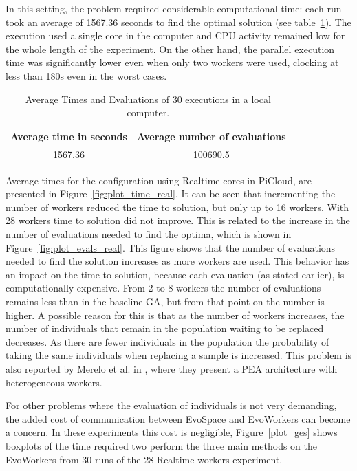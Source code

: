 In this setting, the problem required considerable computational time: each run took an average of 1567.36 seconds to find the optimal solution (see table~\ref{local}).
The execution used a single core in the computer and CPU activity remained low for the whole length of the experiment. On the other hand, the parallel execution time was significantly lower even when only two workers were used,
clocking at less than 180s even in the worst cases.

\begin{table}[t]
\renewcommand{\arraystretch}{1.3}
\caption{Average Times and Evaluations of 30 executions in a local computer.}
\label{local}
\centering
\begin{tabular}{|c|c|}
\hline
Average time in seconds & Average number of evaluations \\
\hline
1567.36 & 100690.5  \\
\hline
\end{tabular}
\end{table}

Average times for the configuration using Realtime cores in PiCloud,
are presented in Figure~\ref{fig:plot_time_real}. It can be seen that
incrementing the number of workers reduced the time to solution, but only up to 16 workers. With 28 workers time to solution did not improve. This is
related to the increase in the number of evaluations needed to find
the optima, which is shown in Figure~\ref{fig:plot_evals_real}.
This figure shows that the number of evaluations needed to find the
solution increases as more workers are used. This behavior has an
impact on the time to solution, because each evaluation (as stated
earlier), is computationally expensive. From 2 to 8 workers the number
of evaluations remains less than in the baseline GA, but from that point on
the number is higher. A possible reason for this is that as
the number of workers increases, the number of individuals that remain
in the population waiting to be replaced decreases. As there are fewer
individuals in the population the probability of taking the same individuals
when replacing a sample is increased. This problem is also reported
by Merelo et al. in  \cite{sofea:naco}, where they present a PEA architecture with heterogeneous workers.

For other problems where the evaluation of individuals is not very
demanding, the added cost of communication between EvoSpace and EvoWorkers can become a concern.
In these experiments this cost is negligible, Figure~\ref{plot_ges} shows boxplots of the time required two perform the
three main methods on the EvoWorkers from 30 runs of the 28 Realtime workers experiment.


